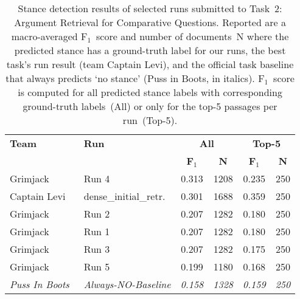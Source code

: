 \begin{table}[t]
\centering
\small
\renewcommand{\tabcolsep}{10pt}
\caption{Stance detection results of selected runs submitted to Task~2: Argument Retrieval for Comparative Questions. Reported are a macro-averaged F$_1$~score and number of documents~N where the predicted stance has a ground-truth label for our runs, the best task's run result (team Captain Levi), and the official task baseline that always predicts `no stance' (Puss in Boots, in italics). F$_1$~score is computed for all predicted stance labels with corresponding ground-truth labels~(All) or only for the top-5 passages per run~(Top-5).}
\label{table-results-stance}
\begin{tabular}{@{}llcccc@{}}
\toprule
\textbf{Team} & \textbf{Run} & \multicolumn{2}{c}{\textbf{All}} & \multicolumn{2}{c}{\textbf{Top-5}} \\
& & \textbf{F$_1$} & \textbf{N} & \textbf{F$_1$} & \textbf{N} \\
\midrule
Grimjack & Run 4 & 0.313 & 1208 & 0.235 & 250 \\
Captain Levi~\cite{RanaGJCEHP2022} & dense\_initial\_retr. & 0.301 & 1688 & 0.359 & 250 \\
Grimjack & Run 2 & 0.207 & 1282 & 0.180 & 250 \\
Grimjack & Run 1 & 0.207 & 1282 & 0.180 & 250 \\
Grimjack & Run 3 & 0.207 & 1282 & 0.175 & 250 \\
Grimjack & Run 5 & 0.199 & 1180 & 0.168 & 250 \\
\textit{Puss In Boots}~\cite{BondarenkoFKSGBPBSWPH2022} & \textit{Always-NO-Baseline} & \textit{0.158} & \textit{1328} & \textit{0.159} & \textit{250} \\
\bottomrule
\end{tabular}
\end{table}
